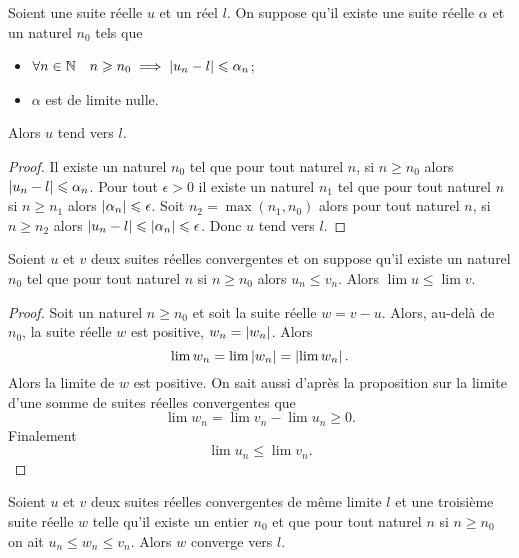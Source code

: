 \begin{prop}
  Soient une suite réelle $u$ et un réel $l$. On suppose qu'il existe une suite réelle $\alpha$ et un naturel $n_0$ tels que
  \begin{itemize}
  \item $\forall n \in \mathbb{N} \quad n \geqslant n_0 \implies \left\lvert u_n-l\right\rvert \leqslant \alpha_n$;
  \item $\alpha$ est de limite nulle.
  \end{itemize}
  Alors $u$ tend vers $l$.
\end{prop}
\begin{proof}
  Il existe un naturel $n_0$ tel que pour tout naturel $n$, si $n \geqslant n_0$ alors $\left\lvert u_n-l\right\rvert \leqslant \alpha_n$. Pour tout $\epsilon>0$ il existe un naturel $n_1$ tel que pour tout naturel $n$ si $n\geqslant n_1$ alors $\left\lvert\alpha_n\right\rvert \leqslant \epsilon$. Soit $n_2=\max(n_1,n_0)$ alors pour tout naturel $n$, si $n \geqslant n_2$ alors $\left\lvert u_n-l\right\rvert\leqslant \left\lvert\alpha_n\right\rvert\leqslant \epsilon$. Donc $u$ tend vers $l$.
\end{proof}
\begin{prop}
  Soient $u$ et $v$ deux suites réelles convergentes et on suppose qu'il existe un naturel $n_0$ tel que pour tout naturel $n$ si $n \geqslant n_0$ alors $u_n \leqslant v_n$. Alors $\lim u \leqslant \lim v$.
\end{prop}
\begin{proof}
  Soit un naturel $n \geqslant n_0$ et soit la suite réelle $w=v-u$. Alors, au-delà de $n_0$, la suite réelle $w$ est positive, $w_n=\left\lvert w_n\right\rvert$. Alors
  \begin{equation}
    \lim w_n=\lim \left\lvert w_n\right\rvert=\left\lvert\lim w_n\right\rvert.
  \end{equation}
Alors la limite de $w$ est positive. On sait aussi d'après la proposition sur la limite d'une somme de suites réelles convergentes que
\begin{equation}
  \lim w_n = \lim v_n - \lim u_n \geqslant 0.
\end{equation}
Finalement
\begin{equation}
  \lim u_n \leqslant \lim v_n.
\end{equation}
\end{proof}
\begin{theo}
  Soient $u$ et $v$ deux suites réelles convergentes de même limite $l$ et une troisième suite réelle $w$ telle qu'il existe un entier $n_0$ et que pour tout naturel $n$ si $n \geqslant n_0$ on ait $u_n \leqslant w_n \leqslant v_n$. Alors $w$ converge vers $l$.
\end{theo}
